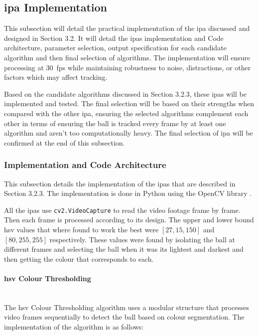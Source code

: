 \documentclass[12pt,a4paper]{article}
\begin{document}
\subsection{\acs{ipa} Implementation}
This subsection will detail the practical implementation of the \acs{ipa} discussed and designed in Section 3.2. It will detail the \acs{ipa}s implementation and Code architecture, parameter selection, output specification for each candidate algorithm and then final selection of algorithms. The implementation will ensure processing at 30~\acs{fps} while maintaining robustness to noise, distractions, or other factors which may affect tracking.

Based on the candidate algorithms discussed in Section 3.2.3, these \acs{ipa}s will be implemented and tested. The final selection will be based on their strengths when compared with the other \acs{ipa}, ensuring the selected algorithms complement each other in terms of ensuring the ball is tracked every frame by at least one algorithm and aren't too computationally heavy. The final selection of \acs{ipa} will be confirmed at the end of this subsection.

\subsubsection{Implementation and Code Architecture}
This subsection details the implementation of the \acs{ipa}s that are described in Section 3.2.3. The implementation is done in Python using the OpenCV library \parencite{opencv_library}. 

All the \acs{ipa}s use \texttt{cv2.VideoCapture} to read the video footage frame by frame. Then each frame is processed according to its design. The upper and lower bound \acs{hsv} values that where found to work the best were $[27, 15, 150]$ and $[80, 255, 255]$ respectively. These values were found by isolating the ball at different frames and selecting the ball when it was its lightest and darkest and then getting the colour that corresponds to each.


\paragraph{\acs{hsv} Colour Thresholding}
\mbox{}\\
The \acs{hsv} Colour Thresholding algorithm uses a modular structure that processes video frames sequentially to detect the ball based on colour segmentation. The implementation of the algorithm is as follows:
\end{document}
